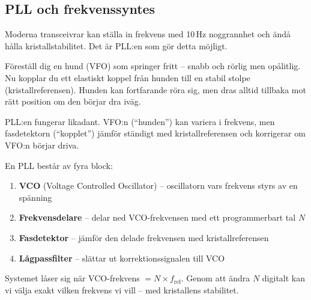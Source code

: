 \documentclass[a4paper,11pt,twoside]{book}
\newcommand{\emoji}[1]{{\emojifont #1}}
\begin{document}
\subsection{PLL och frekvenssyntes}

Moderna transceivrar kan ställa in frekvens med 10\,Hz noggrannhet
och ändå hålla kristallstabilitet. Det är PLL:en som gör detta möjligt.

\begin{storybox}[{\emoji{🔒} Hunden i kopplet}]
Föreställ dig en hund (VFO) som springer fritt -- snabb och rörlig
men opålitlig. Nu kopplar du ett elastiskt koppel från hunden till
en stabil stolpe (kristallreferensen). Hunden kan fortfarande röra
sig, men dras alltid tillbaka mot rätt position om den börjar dra iväg.

PLL:en fungerar likadant. VFO:n (``hunden'') kan variera i frekvens,
men fasdetektorn (``kopplet'') jämför ständigt med kristallreferensen
och korrigerar om VFO:n börjar driva.
\end{storybox}

\begin{bluebox}[title={\emoji{🔑} PLL -- Phase Locked Loop}]
En PLL består av fyra block:

\begin{enumerate}
  \item \textbf{VCO} (Voltage Controlled Oscillator) -- oscillatorn
        vars frekvens styrs av en spänning
  \item \textbf{Frekvensdelare} -- delar ned VCO-frekvensen med
        ett programmerbart tal $N$
  \item \textbf{Fasdetektor} -- jämför den delade frekvensen med
        kristallreferensen
  \item \textbf{Lågpassfilter} -- slättar ut korrektionssignalen
        till VCO
\end{enumerate}

Systemet låser sig när VCO-frekvens $= N \times f_{\text{ref}}$.
Genom att ändra $N$ digitalt kan vi välja exakt vilken frekvens vi vill --
med kristallens stabilitet.
\end{bluebox}
\end{document}
